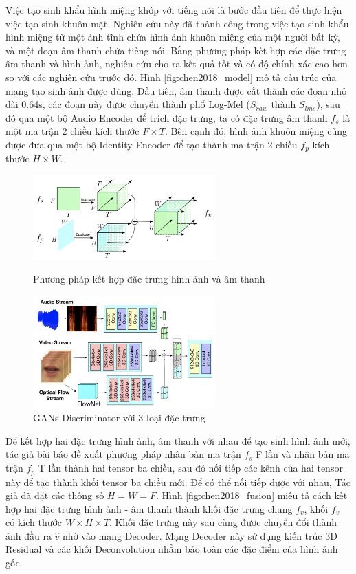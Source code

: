 Việc tạo sinh khẩu hình miệng khớp với tiếng nói là bước đầu tiên để thực hiện việc tạo sinh khuôn mặt. Nghiên cứu này đã thành công trong việc tạo sinh khẩu hình miệng từ một ảnh tĩnh chứa hình ảnh khuôn miệng của một người bất kỳ, và một đoạn âm thanh chứa tiếng nói. Bằng phương pháp kết hợp các đặc trưng âm thanh và hình ảnh, nghiên cứu cho ra kết quả tốt và có độ chính xác cao hơn so với các nghiên cứu trước đó. Hình \ref{fig:chen2018_model} mô tả cấu trúc của mạng tạo sinh ảnh được dùng. Đầu tiên, âm thanh được cắt thành các đoạn nhỏ dài 0.64s, các đoạn này được chuyển thành phổ Log-Mel ($S_{raw}$ thành $S_{lms}$), sau đó qua một bộ Audio Encoder để trích đặc trưng, ta có đặc trưng âm thanh $f_s$ là một ma trận 2 chiều kích thước $F \times T$. Bên cạnh đó, hình ảnh khuôn miệng cũng được đưa qua một bộ Identity Encoder để tạo thành ma trận 2 chiều $f_p$ kích thước $H \times W$.

\begin{figure}[H]
    \centering
    \begin{minipage}{0.48\textwidth}
        \includegraphics[width=7cm]{./content/images/chen2018_fusion.png}
        \caption{Phương pháp kết hợp đặc trưng hình ảnh và âm thanh}
        \label{fig:chen2018_fusion}
    \end{minipage}\hfill
    \begin{minipage}{0.48\textwidth}
        \includegraphics[width=7cm]{./content/images/chen2018_gans.png}
        \caption{GANs Discriminator với 3 loại đặc trưng}
        \label{fig:chen2018_gans}
    \end{minipage}
\end{figure}

Để kết hợp hai đặc trưng hình ảnh, âm thanh với nhau để tạo sinh hình ảnh mới, tác giả bài báo đề xuất phương pháp nhân bản ma trận $f_s$ F lần và nhân bản ma trận $f_p$ T lần thành hai tensor ba chiều, sau đó nối tiếp các kênh của hai tensor này để tạo thành khối tensor ba chiều mới. Để có thể nối tiếp được với nhau, Tác giả đã đặt các thông số $H = W = F$. Hình \ref{fig:chen2018_fusion} miêu tả cách kết hợp hai đặc trưng hình ảnh - âm thanh thành khối đặc trưng chung $f_v$, khối $f_v$ có kích thước $W \times H \times T$. Khối đặc trưng này sau cùng được chuyển đổi thành ảnh đầu ra $\hat{v}$ nhờ vào mạng Decoder. Mạng Decoder này sử dụng kiến trúc 3D Residual và các khối Deconvolution nhằm bảo toàn các đặc điểm của hình ảnh gốc.

